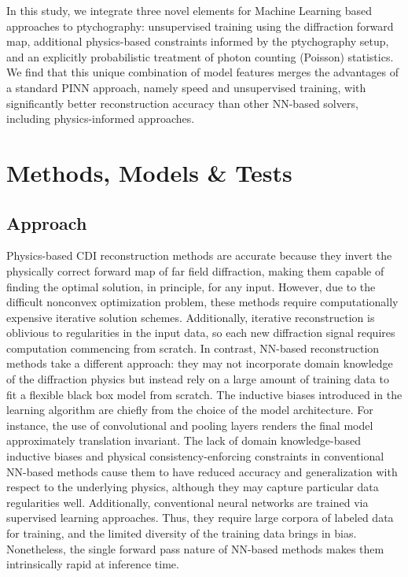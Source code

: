 \documentclass[sn-mathphys]{sn-jnl}%
\theoremstyle{thmstyleone}%
\theoremstyle{thmstyletwo}%
\theoremstyle{thmstylethree}%
\begin{document}
In this study, we integrate three novel elements for Machine Learning based approaches to ptychography: unsupervised training using the diffraction forward map, additional physics-based constraints informed by the ptychography setup, and an explicitly probabilistic treatment of photon counting (Poisson) statistics. We find that this unique combination of model features merges the advantages of a standard PINN approach, namely speed and unsupervised training, with significantly better reconstruction accuracy than other NN-based solvers, including physics-informed approaches.


\section{Methods, Models \& Tests}
\subsection{Approach}

Physics-based CDI reconstruction methods are accurate because they invert the physically correct forward map of far field diffraction, making them capable of finding the optimal solution, in principle, for any input. However, due to the difficult nonconvex optimization problem, these methods require computationally expensive iterative solution schemes. Additionally, iterative reconstruction is oblivious to regularities in the input data, so each new diffraction signal requires computation commencing from scratch. In contrast, NN-based reconstruction methods take a different approach: they may not incorporate domain knowledge of the diffraction physics but instead rely on a large amount of training data to fit a flexible black box model from scratch. The inductive biases introduced in the learning algorithm are chiefly from the choice of the model architecture. For instance, the use of convolutional and pooling layers renders the final model approximately translation invariant. The lack of domain knowledge-based inductive biases and physical consistency-enforcing constraints in conventional NN-based methods cause them to have reduced accuracy and generalization with respect to the underlying physics, although they may capture particular data regularities well. Additionally, conventional neural networks are trained via supervised learning approaches. Thus, they require large corpora of labeled data for training, and the limited diversity of the training data brings in bias. Nonetheless, the single forward pass nature of NN-based methods makes them intrinsically rapid at inference time.
\end{document}
